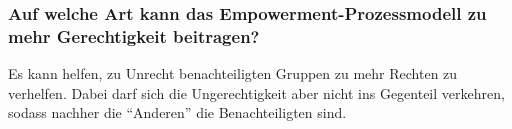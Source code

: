 \subsubsection{Auf welche Art kann das Empowerment-Prozessmodell zu mehr Gerechtigkeit beitragen?}
Es kann helfen, zu Unrecht benachteiligten Gruppen zu mehr Rechten zu verhelfen. Dabei darf sich die Ungerechtigkeit aber nicht ins Gegenteil verkehren, sodass nachher die ``Anderen'' die Benachteiligten sind.
